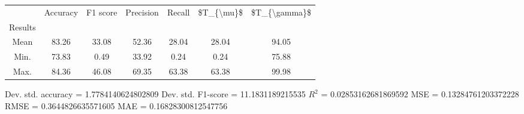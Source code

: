 \begin{tabular}{|c|c|c|c|c|c|c|}
\toprule
{} &  Accuracy &  F1 score &  Precision &  Recall &  \$T\_\{\textbackslash mu\}\$ &  \$T\_\{\textbackslash gamma\}\$ \\
Results &           &           &            &         &            &               \\
\hline
Mean    &     83.26 &     33.08 &      52.36 &   28.04 &      28.04 &         94.05 \\
Min.    &     73.83 &      0.49 &      33.92 &    0.24 &       0.24 &         75.88 \\
Max.    &     84.36 &     46.08 &      69.35 &   63.38 &      63.38 &         99.98 \\
\bottomrule
\end{tabular}

 Dev. std. accuracy = 1.7784140624802809
 Dev. std. F1-score = 11.1831189215535
 $R^2$ = 0.02853162681869592
 MSE = 0.13284761203372228
 RMSE = 0.3644826635571605
 MAE = 0.16828300812547756